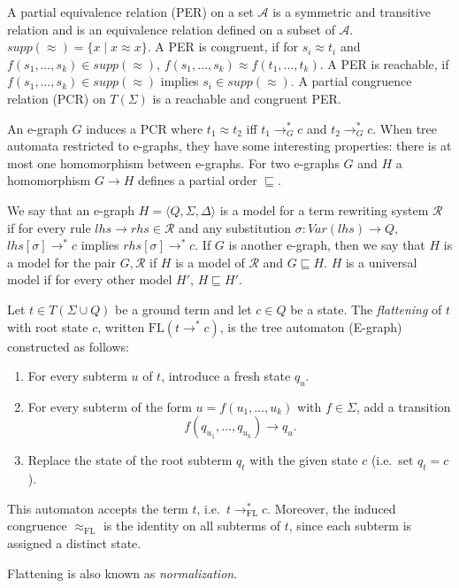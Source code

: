 \documentclass[acmsmall,screen, nonacm, anonymous]{acmart}
\begin{document}
\begin{definition}
  A partial equivalence relation (PER) on a set $\mathcal{A}$ is a symmetric and transitive relation and is an equivalence relation defined on a subset of $\mathcal{A}$.
  $supp(\approx) = \{x \mid x \approx x\}$.
  A PER is congruent, if for $s_i \approx t_i$ and $f(s_1, \ldots, s_k) \in supp(\approx)$, $f(s_1, \ldots, s_k) \approx f(t_1, \ldots, t_k)$.
  A PER is reachable, if $f(s_1, \ldots, s_k) \in supp(\approx)$ implies $s_i \in supp(\approx)$.
  A partial congruence relation (PCR) on $T(\Sigma)$ is a reachable and congruent PER. 
\end{definition}
An e-graph $G$ induces a PCR where $t_1 \approx t_2$ iff $t_1 \to^{*}_{G} c$ and $t_2 \to^{*}_{G} c$.
When tree automata restricted to e-graphs, they have some interesting properties: there is at most one homomorphism between e-graphs.
For two e-graphs $G$ and $H$ a homomorphism $G \to H$ defines a partial order $\sqsubseteq$.

\begin{definition}
  We say that an e-graph $H = \langle Q, \Sigma, \Delta \rangle$ is a model for a term rewriting system $\mathcal{R}$ if for every rule $lhs \to rhs \in \mathcal{R}$ and any substitution $\sigma : Var(lhs) \to Q$, $lhs[\sigma] \to^{*} c$ implies $rhs[\sigma] \to^{*} c$.
  If $G$ is another e-graph, then we say that $H$ is a model for the pair $G,\mathcal{R}$ if $H$ is a model of $\mathcal{R}$ and $G \sqsubseteq H$.
  $H$ is a universal model if for every other model $H'$, $H \sqsubseteq H'$.
\end{definition}

\begin{definition}
Let $t \in T(\Sigma \cup Q)$ be a ground term and let $c \in Q$ be a state.  
The \emph{flattening} of $t$ with root state $c$, written $\mathrm{FL}(t \to^* c)$, is the tree automaton (E-graph) constructed as follows:

\begin{enumerate}
  \item For every subterm $u$ of $t$, introduce a fresh state $q_u$.
  \item For every subterm of the form $u = f(u_1,\dots,u_k)$ with $f \in \Sigma$, add a transition
  \[
      f(q_{u_1},\dots,q_{u_k}) \to q_u .
  \]
  \item Replace the state of the root subterm $q_t$ with the given state $c$ (i.e.\ set $q_t = c$).
\end{enumerate}

This automaton accepts the term $t$, i.e.\ $t \to^*_{\mathrm{FL}} c$.  
Moreover, the induced congruence $\approx_{\mathrm{FL}}$ is the identity on all subterms of $t$, since each subterm is assigned a distinct state.

Flattening is also known as \emph{normalization}.
\end{definition}
\end{document}
